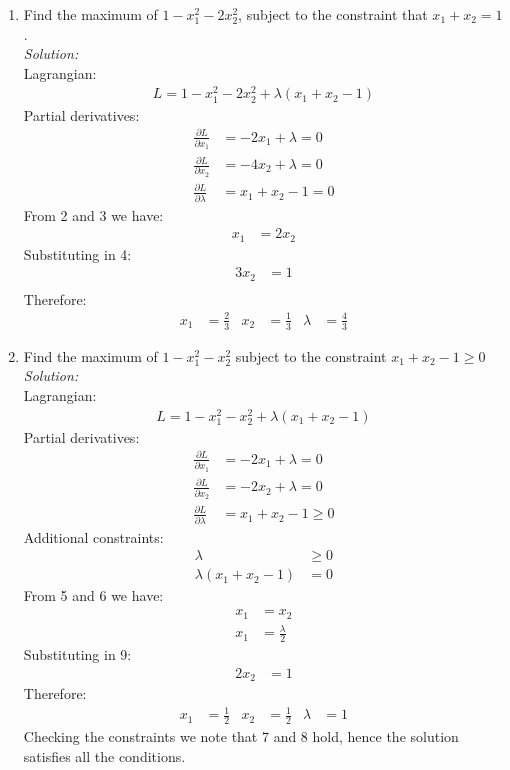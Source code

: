 \documentclass[12pt,a4paper]{article}
\begin{document}
\begin{enumerate}
\item Find the maximum of $1 - x_1^2 - 2x_2^2$, subject to the constraint that $x_1+x_2=1$. \\
	\emph{Solution:} \\
		Lagrangian:
			\begin{align*}
			  	L = 1 - x_1^2 -2x_2^2 + \lambda (x_1 + x_2 - 1)
			\end{align*}
		Partial derivatives:
			\begin{align}
				\frac{\partial L}{\partial x_1} &= -2x_1 + \lambda = 0 \\
				\frac{\partial L}{\partial x_2} &= -4x_2 + \lambda = 0 \\
				\frac{\partial L}{\partial \lambda} &= x_1 + x_2 - 1 = 0
			\end{align}
		From 2 and 3 we have: 
			\begin{align*}
				x_1 &= 2x_2
			\end{align*}
		Substituting in 4:
			\begin{align*}
				3x_2 &= 1 \\
			\end{align*}
		Therefore:
			\begin{align*}
			x_1 &= \frac{2}{3} &
			x_2 &= \frac{1}{3} &
			\lambda &=  \frac{4}{3}
			\end{align*}

\item Find the maximum of $1-x_1^2 -x_2^2$ subject to the constraint $x_1+x_2-1\geqslant 0$ \\
	\emph{Solution:} \\
		Lagrangian:
			\begin{align*}
			L = 1 - x_1^2 - x_2^2 + \lambda (x_1 + x_2 - 1)
			\end{align*}
		Partial derivatives:
			\begin{align}
			\frac{\partial L}{\partial x_1} &= -2x_1 + \lambda = 0 \\
			\frac{\partial L}{\partial x_2} &= -2x_2 + \lambda = 0 \\
			\frac{\partial L}{\partial \lambda} &= x_1 + x_2 - 1 \geqslant 0
			\end{align}
		Additional constraints:
			\begin{align}
				\lambda &\geqslant 0 \\
				\lambda (x_1 + x_2 - 1) &= 0
			\end{align}
		From 5 and 6 we have: 
			\begin{align*}
			x_1 &= x_2 \\
			x_1 &= \frac{\lambda}{2}
			\end{align*}
		Substituting in 9:
			\begin{align*}
			2x_2 &= 1
			\end{align*}
		Therefore:
			\begin{align*}
			x_1 &= \frac{1}{2} &
			x_2 &= \frac{1}{2} &
			\lambda &=  1
			\end{align*}
		Checking the constraints we note that 7 and 8 hold, hence the solution satisfies all the conditions.


\end{enumerate}
\end{document}
